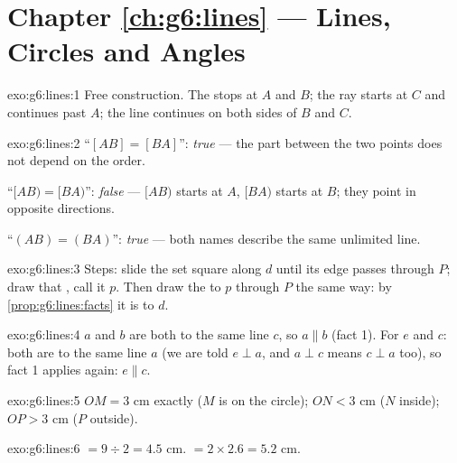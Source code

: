 \section*{Chapter \ref{ch:g6:lines} --- Lines, Circles and Angles}

\begin{solution}{exo:g6:lines:1}
Free construction. The  stops at $A$ and $B$; the ray starts at
$C$ and continues past $A$; the line continues on both sides of $B$
and $C$.
\end{solution}

\begin{solution}{exo:g6:lines:2}
``$[AB] = [BA]$'': \emph{true} --- the part between the two points does
not depend on the order.

``$[AB) = [BA)$'': \emph{false} --- $[AB)$ starts at $A$, $[BA)$ starts
at $B$; they point in opposite directions.

``$(AB) = (BA)$'': \emph{true} --- both names describe the same
unlimited line.
\end{solution}

\begin{solution}{exo:g6:lines:3}
Steps: slide the set square along $d$ until its  edge
passes through $P$; draw that , call it $p$. Then draw
the  to $p$ through $P$ the same way: by
\cref{prop:g6:lines:facts} it is  to $d$.
\end{solution}

\begin{solution}{exo:g6:lines:4}
$a$ and $b$ are both  to the same line $c$, so
$a \parallel b$ (fact 1). For $e$ and $c$: both are  to
the same line $a$ (we are told $e \perp a$, and $a \perp c$ means
$c \perp a$ too), so fact 1 applies again: $e \parallel c$.
\end{solution}

\begin{solution}{exo:g6:lines:5}
$OM = 3$ cm exactly ($M$ is on the circle); $ON < 3$ cm ($N$ inside);
$OP > 3$ cm ($P$ outside).
\end{solution}

\begin{solution}{exo:g6:lines:6}
 $= 9 \div 2 = 4.5$ cm. \quad {} $= 2 \times 2.6 = 5.2$ cm.
\end{solution}

